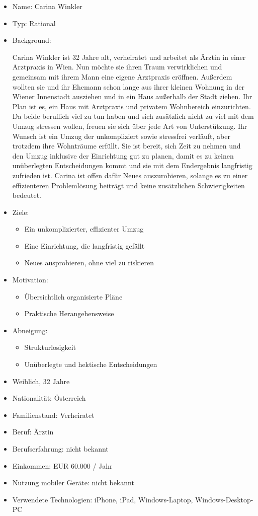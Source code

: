 \documentclass[12pt,paper=a4,oneside,hidelinks,headings=small,captions=heading,captions=nooneline]{scrartcl}
\begin{document}
\begin{itemize}
\item Name: Carina Winkler
\item Typ: Rational
\item Background:

Carina Winkler ist 32 Jahre alt, verheiratet und arbeitet als Ärztin
in einer Arztpraxis in Wien. Nun möchte sie ihren Traum
verwirklichen und gemeinsam mit ihrem Mann eine eigene Arztpraxis
eröffnen. Außerdem wollten sie und ihr Ehemann schon lange aus ihrer
kleinen Wohnung in der Wiener Innenstadt ausziehen und in ein Haus
außerhalb der Stadt ziehen. Ihr Plan ist es, ein Haus mit Arztpraxis
und privatem Wohnbereich einzurichten. Da beide beruflich viel zu
tun haben und sich zusätzlich nicht zu viel mit dem Umzug stressen
wollen, freuen sie sich über jede Art von Unterstützung. Ihr Wunsch
ist ein Umzug der unkompliziert sowie stressfrei verläuft, aber
trotzdem ihre Wohnträume erfüllt. Sie ist bereit, sich Zeit zu
nehmen und den Umzug inklusive der Einrichtung gut zu planen, damit
es zu keinen unüberlegten Entscheidungen kommt und sie mit dem
Endergebnis langfristig zufrieden ist. Carina ist offen dafür Neues
auszurobieren, solange es zu einer effizienteren Problemlösung
beiträgt und keine zusätzlichen Schwierigkeiten bedeutet.

\item Ziele:
\begin{itemize}
\item Ein unkomplizierter, effizienter Umzug
\item Eine Einrichtung, die langfristig gefällt
\item Neues ausprobieren, ohne viel zu riskieren
\end{itemize}
\item Motivation:
\begin{itemize}
\item Übersichtlich organisierte Pläne
\item Praktische Herangehensweise
\end{itemize}
\item Abneigung:
\begin{itemize}
\item Strukturlosigkeit
\item Unüberlegte und hektische Entscheidungen
\end{itemize}
\item Weiblich, 32 Jahre
\item Nationalität: Österreich
\item Familienstand: Verheiratet
\item Beruf: Ärztin
\item Berufserfahrung: nicht bekannt
\item Einkommen: EUR 60.000 / Jahr
\item Nutzung mobiler Geräte: nicht bekannt
\item Verwendete Technologien: iPhone, iPad, Windows-Laptop,
Windows-Desktop-PC
\end{itemize}
\end{document}
